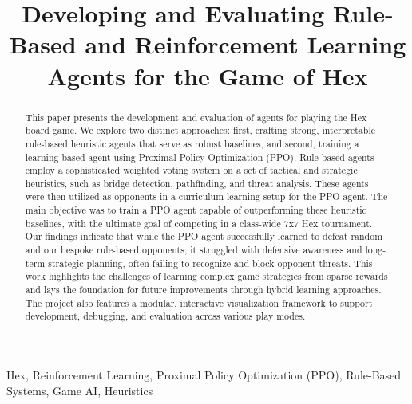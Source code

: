 \documentclass[conference]{IEEEtran}
\begin{document}
\title{Developing and Evaluating Rule-Based and Reinforcement Learning Agents for the Game of Hex}

\author{
\and
{}
}

\maketitle

\begin{abstract}
This paper presents the development and evaluation of agents for playing the Hex board game. We explore two distinct approaches: first, crafting strong, interpretable rule-based heuristic agents that serve as robust baselines, and second, training a learning-based agent using Proximal Policy Optimization (PPO). Rule-based agents employ a sophisticated weighted voting system on a set of tactical and strategic heuristics, such as bridge detection, pathfinding, and threat analysis. These agents were then utilized as opponents in a curriculum learning setup for the PPO agent. The main objective was to train a PPO agent capable of outperforming these heuristic baselines, with the ultimate goal of competing in a class-wide 7x7 Hex tournament. Our findings indicate that while the PPO agent successfully learned to defeat random and our bespoke rule-based opponents, it struggled with defensive awareness and long-term strategic planning, often failing to recognize and block opponent threats. This work highlights the challenges of learning complex game strategies from sparse rewards and lays the foundation for future improvements through hybrid learning approaches. The project also features a modular, interactive visualization framework to support development, debugging, and evaluation across various play modes.
\end{abstract}

\begin{IEEEkeywords}
Hex, Reinforcement Learning, Proximal Policy Optimization (PPO), Rule-Based Systems, Game AI, Heuristics
\end{IEEEkeywords}
\end{document}
